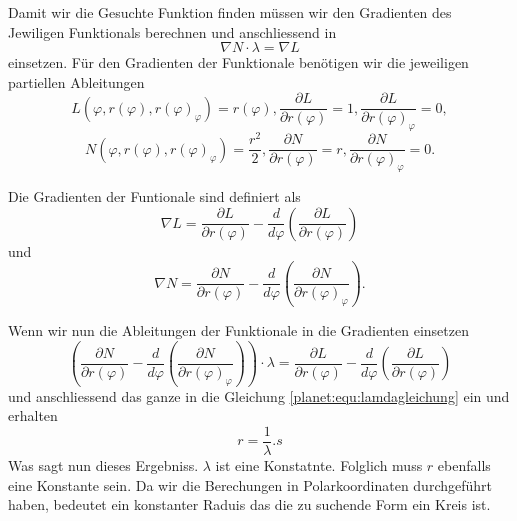 Damit wir die Gesuchte Funktion finden müssen wir den Gradienten des Jewiligen Funktionals berechnen und anschliessend in
\begin{equation}
	\nabla N \cdot \lambda = \nabla L
	\label{planet:equ:lamdagleichung}
\end{equation}
einsetzen.
Für den Gradienten der Funktionale benötigen wir die jeweiligen partiellen Ableitungen
\begin{equation*}
	L(\varphi ,r(\varphi),r(\varphi)_\varphi) = r(\varphi),
	\frac{\partial L}{\partial r(\varphi)} = 1,
	\frac{\partial L}{\partial r(\varphi)_\varphi} = 0,
\end{equation*}
\begin{equation*}
	N(\varphi ,r(\varphi),r(\varphi)_\varphi) = \frac{r^2}{2} ,
	\frac{\partial N}{\partial r(\varphi)} = r,
	\frac{\partial N}{\partial r(\varphi)_\varphi} = 0.
\end{equation*}

Die Gradienten der Funtionale sind definiert als 
\begin{equation*}
	\nabla L = 
	\frac{\partial L}{\partial r(\varphi)}-  \frac{d}{d\varphi}\left( \frac{\partial L}{\partial r(\varphi)} \right)
\end{equation*}
und
\begin{equation*}
	\nabla N = \frac{\partial N}{\partial r(\varphi)} - \frac{d}{d\varphi}\left(\frac{\partial N}{\partial r(\varphi)_\varphi}\right).
\end{equation*}

Wenn wir nun die Ableitungen der Funktionale in die Gradienten einsetzen
\begin{equation*}
	\left(\frac{\partial N}{\partial r(\varphi)} - \frac{d}{d\varphi}\left(\frac{\partial N}{\partial r(\varphi)_\varphi}\right)\right)\cdot \lambda = \frac{\partial L}{\partial r(\varphi)}-  \frac{d}{d\varphi}\left( \frac{\partial L}{\partial r(\varphi)} \right)
\end{equation*} 
und anschliessend das ganze in die Gleichung \ref{planet:equ:lamdagleichung}
ein und erhalten
\begin{equation*}
	r = \frac{1}{\lambda}.s
\end{equation*}
Was sagt nun dieses Ergebniss.
\(\lambda\) ist eine Konstatnte.
Folglich muss \(r\) ebenfalls eine Konstante sein.
Da wir die Berechungen in Polarkoordinaten durchgeführt haben, bedeutet ein konstanter Raduis das die zu suchende Form ein Kreis ist.

